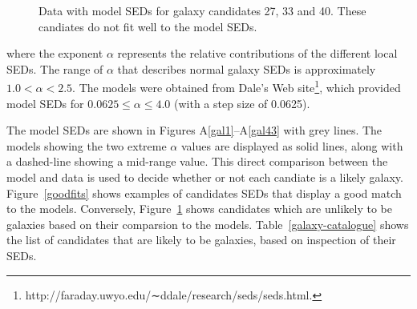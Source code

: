 \documentclass[times,usenatbib]{mn2e}
\begin{document}
\begin{figure}
\begin{center}
\caption{Data with model SEDs for galaxy candidates 27, 33 and 40. These candiates do not fit well to the model SEDs.}
\label{badfits}
\end{center}
\end{figure} 
 
where the exponent $\alpha$ represents the relative contributions of the different local SEDs. The range of $\alpha$ that describes normal galaxy SEDs is approximately $1.0 < \alpha < 2.5$. The models were obtained from Dale’s Web site\footnote{http://faraday.uwyo.edu/∼ddale/research/seds/seds.html.}, which provided model SEDs for $0.0625 \leq \alpha \leq 4.0$ (with a step size of 0.0625).

The model SEDs are shown in Figures A\ref{gal1}--A\ref{gal43} with grey lines. The models showing the two extreme $\alpha$ values are displayed as solid lines, along with a dashed-line showing a mid-range value. This direct comparison between the model and data is used to decide whether or not each candiate is a likely galaxy. Figure~\ref{goodfits} shows examples of candidates SEDs that display a good match to the models. Conversely, Figure~\ref{badfits} shows candidates which are unlikely to be galaxies based on their comparsion to the models. Table~\ref{galaxy-catalogue} shows the list of candidates that are likely to be galaxies, based on inspection of their SEDs.
\end{document}

